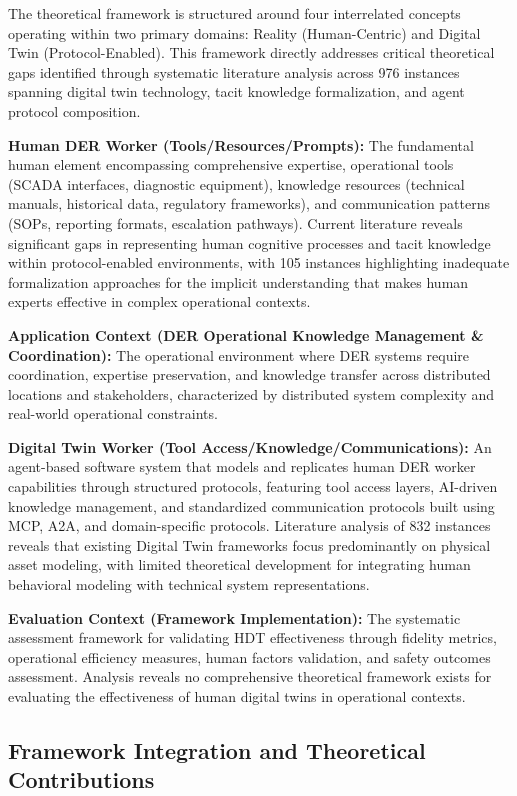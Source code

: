 \documentclass[12pt,a4paper]{article}
\begin{document}
The theoretical framework is structured around four interrelated concepts operating within two primary domains: Reality (Human-Centric) and Digital Twin (Protocol-Enabled). This framework directly addresses critical theoretical gaps identified through systematic literature analysis across 976 instances spanning digital twin technology, tacit knowledge formalization, and agent protocol composition.

\textbf{Human DER Worker (Tools/Resources/Prompts):} The fundamental human element encompassing comprehensive expertise, operational tools (SCADA interfaces, diagnostic equipment), knowledge resources (technical manuals, historical data, regulatory frameworks), and communication patterns (SOPs, reporting formats, escalation pathways). Current literature reveals significant gaps in representing human cognitive processes and tacit knowledge within protocol-enabled environments, with 105 instances highlighting inadequate formalization approaches for the implicit understanding that makes human experts effective in complex operational contexts.

\textbf{Application Context (DER Operational Knowledge Management \& Coordination):} The operational environment where DER systems require coordination, expertise preservation, and knowledge transfer across distributed locations and stakeholders, characterized by distributed system complexity and real-world operational constraints.

\textbf{Digital Twin Worker (Tool Access/Knowledge/Communications):} An agent-based software system that models and replicates human DER worker capabilities through structured protocols, featuring tool access layers, AI-driven knowledge management, and standardized communication protocols built using MCP, A2A, and domain-specific protocols. Literature analysis of 832 instances reveals that existing Digital Twin frameworks focus predominantly on physical asset modeling, with limited theoretical development for integrating human behavioral modeling with technical system representations.

\textbf{Evaluation Context (Framework Implementation):} The systematic assessment framework for validating HDT effectiveness through fidelity metrics, operational efficiency measures, human factors validation, and safety outcomes assessment. Analysis reveals no comprehensive theoretical framework exists for evaluating the effectiveness of human digital twins in operational contexts.

\subsection{Framework Integration and Theoretical Contributions}
\end{document}
